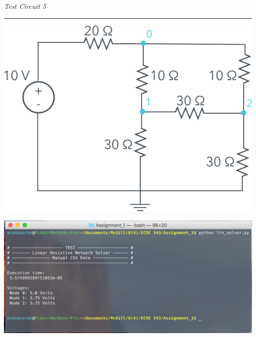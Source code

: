 \documentclass[11pt]{amsart}
\begin{document}
\begin{minipage}{\textwidth}
    \textit{Test Circuit 5}\\
    \noindent\rule[0.5ex]{\linewidth}{0.5pt}
\end{minipage}
\begin{minipage}{0.3\textwidth}
\end{minipage}
\begin{minipage}{0.7\textwidth}
	\begin{center}
		\vspace{2em}
        		\includegraphics[width=\textwidth]{assets/sk_test_c5.png}
	\end{center}
\end{minipage}
\begin{minipage}{\textwidth}
	\vspace{2em}
	\centering
	\includegraphics[width=\textwidth]{assets/test_c5.png}\\
\end{minipage}
\pagebreak
\end{document}
